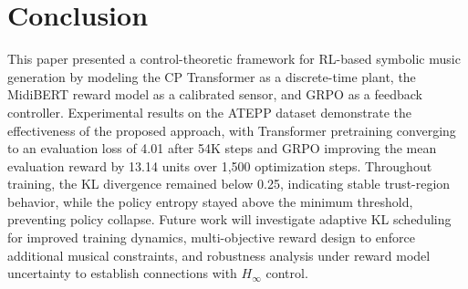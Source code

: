 \documentclass[letterpaper, 10 pt, conference]{ieeeconf}
\begin{document}
\section{Conclusion}

This paper presented a control-theoretic framework for RL-based symbolic music generation by modeling the CP Transformer as a discrete-time plant, the MidiBERT reward model as a calibrated sensor, and GRPO as a feedback controller. Experimental results on the ATEPP dataset demonstrate the effectiveness of the proposed approach, with Transformer pretraining converging to an evaluation loss of 4.01 after 54K steps and GRPO improving the mean evaluation reward by 13.14 units over 1,500 optimization steps. Throughout training, the KL divergence remained below 0.25, indicating stable trust-region behavior, while the policy entropy stayed above the minimum threshold, preventing policy collapse. Future work will investigate adaptive KL scheduling for improved training dynamics, multi-objective reward design to enforce additional musical constraints, and robustness analysis under reward model uncertainty to establish connections with $H_\infty$ control.


\end{document}
